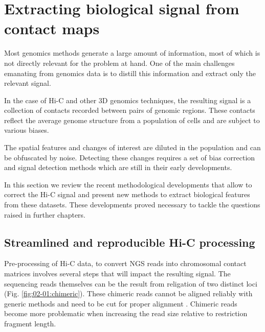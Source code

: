 
\chapter{Extracting biological signal from contact maps} %

\label{ch:02-01} %


Most genomics methods generate a large amount of information, most of which is not directly relevant for the problem at hand. One of the main challenges emanating from genomics data is to distill this information and extract only the relevant signal.

In the case of Hi-C and other 3D genomics techniques, the resulting signal is a collection of contacts recorded between pairs of genomic regions. These contacts reflect the average genome structure from a population of cells and are subject to various biases.

The spatial features and changes of interest are diluted in the population and can be obfuscated by noise. Detecting these changes requires a set of bias correction and signal detection methods which are still in their early developments.

In this section we review the recent methodological developments that allow to correct the Hi-C signal and present new methods to extract biological features from these datasets. These developments proved necessary to tackle the questions raised in further chapters.

\section{Streamlined and reproducible Hi-C processing}
\label{sec:02-01:streamlined-processing}

Pre-processing of Hi-C data, to convert \acrfull{NGS} reads into chromosomal contact matrices involves several steps that will impact the resulting signal. The sequencing reads themselves can be the result from religation of two distinct loci (Fig. \ref{fig:02-01:chimeric}). These chimeric reads cannot be aligned reliably with generic methods and need to be cut for proper alignment \cite{lajoieHitchhikerGuideHiC2015}. Chimeric reads become more problematic when increasing the read size relative to restriction fragment length.


